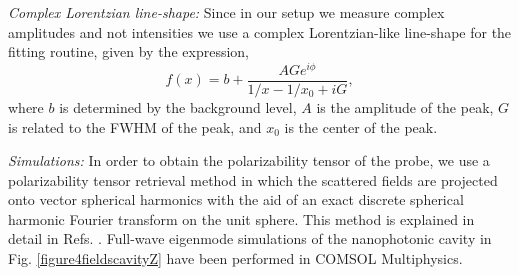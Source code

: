 \documentclass{osa-article}
\begin{document}
	\textit{Complex Lorentzian line-shape:} Since in our setup we measure complex amplitudes and not intensities we use a complex Lorentzian-like line-shape for the fitting routine, given by the expression,
	\begin{equation}
		f(x)=b+\frac{A G e^{i \phi}}{1/x-1/x_{0}+i G},
	\end{equation}
	where $b$ is determined by the background level, $A$ is the amplitude of the peak, $G$ is related to the FWHM of the peak, and $x_{0}$ is the center of the peak.\par
	\textit{Simulations:} In order to obtain the polarizability tensor of the probe, we use a polarizability tensor retrieval method in which the scattered fields are projected onto vector spherical harmonics with the aid of an exact discrete spherical harmonic Fourier transform on the unit sphere. This method is explained in detail in Refs. \cite{Bernal_2013,Bernal_2014}. Full-wave eigenmode simulations of the nanophotonic cavity in Fig. \ref{figure4fieldscavityZ} have been performed in COMSOL Multiphysics. %
	
	
\end{document}
